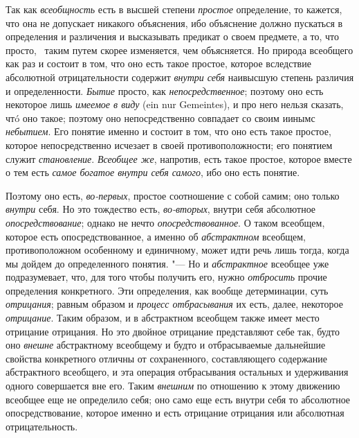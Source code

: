 {Так как {\em всеобщность}
есть в высшей степени
{\em простое}
определение, то кажется, что она не допускает никакого
объяснения, ибо объяснение должно пускаться в определения и различения и
высказывать предикат о своем предмете, а то, что просто,
\ таким путем скорее изменяется, чем объясняется. Но природа
всеобщего как раз и состоит в том, что оно есть такое простое, которое
вследствие абсолютной отрицательности содержит
{\em внутри себя}
наивысшую степень различия и определенности.
{\em Бытие} просто, как
{\em непосредственное};
поэтому оно есть некоторое лишь
{\em имеемое в виду} (ein nur
Gemeintes), и про него нельзя сказать, чтó оно такое; поэтому
оно непосредственно совпадает со своим иинымс
{\em небытием}.
Его понятие именно и состоит в том, что оно есть такое
простое, которое непосредственно исчезает в своей
противоположности; его понятием служит
{\em становление}.
{\em Всеобщее же},
напротив, есть такое простое, которое вместе о тем есть
{\em самое богатое внутри себя самого},
ибо оно есть понятие.

Поэтому оно есть,
{\em во-первых}, простое
соотношение с собой самим; оно только
{\em внутри} себя. Но это
тождество есть, {\em во-вторых},
внутри себя абсолютное
{\em опосредствование};
однако не нечто
{\em опосредствованное}.
О таком всеобщем, которое есть опосредствованное, а именно об
{\em абстрактном}
всеобщем, противоположном особенному и единичному, может идти
речь лишь тогда, когда мы дойдем до определенного понятия. "---
Но и {\em абстрактное}
всеобщее уже подразумевает, что, для того чтобы получить его,
нужно {\em отбросить}
прочие определения конкретного. Эти определения, как вообще
детерминации, суть {\em отрицания};
равным образом и
{\em процесс отбрасывания}
их есть, далее, некоторое
{\em отрицание}. Таким
образом, и в абстрактном всеобщем также имеет место отрицание отрицания. Но
это двойное отрицание представляют себе так, будто оно
{\em внешне} абстрактному
всеобщему и будто и отбрасываемые дальнейшие свойства конкретного отличны
от сохраненного, составляющего содержание абстрактного всеобщего, и эта
операция отбрасывания остальных и удерживания одного совершается вне его.
Таким {\em внешним} по
отношению к этому движению всеобщее еще не определило себя; оно само еще
есть внутри себя то абсолютное опосредствование, которое именно и есть
отрицание отрицания или абсолютная отрицательность.

}
